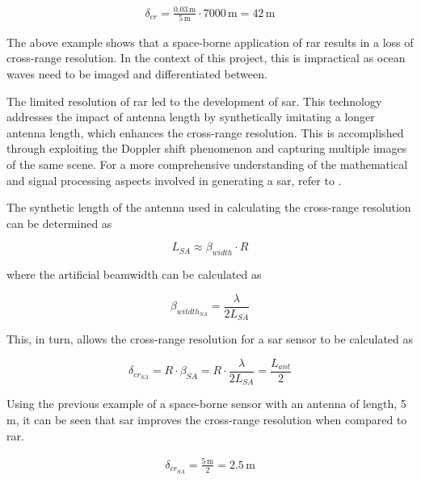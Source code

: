\begin{gather*}
    \delta_{cr} = \frac{0.03\,\text{m}}{5\,\text{m}} \cdot 7000\,\text{m} = 42\,\text{m}
\end{gather*}

The above example shows that a space-borne application of \acs{rar} results in a loss of cross-range resolution. In the context of this project, this is impractical as ocean waves need to be imaged and differentiated between.

The limited resolution of \acs{rar} led to the development of \acs{sar}. This technology addresses the impact of antenna length by synthetically imitating a longer antenna length, which enhances the cross-range resolution. This is accomplished through exploiting the Doppler shift phenomenon and capturing multiple images of the same scene. For a more comprehensive understanding of the mathematical and signal processing aspects involved in generating a \acs{sar}, refer to \cite{Cumming2005}.


The synthetic length of the antenna \cite{Meyer2019} used in calculating the cross-range resolution can be determined as

\begin{equation} \label{eq:sar.virtualAntennaL}
    L_{SA} \approx \beta_{width}\cdot R 
\end{equation}

where the artificial beamwidth can be calculated as

\begin{equation} \label{eq:sar.beamwidth}
    \beta_{witdth_{SA}} = \frac{\lambda}{2L_{SA}}
\end{equation}

This, in turn, allows the cross-range resolution \cite{Moreira2013} for a \acs{sar} sensor to be calculated as

\begin{equation} \label{eq:sar.crossRangeResolution}
    \delta_{cr_{SA}} = R\cdot \beta_{SA} = R \cdot \frac{\lambda}{2L_{SA}} = \frac{L_{ant}}{2}
\end{equation}

Using the previous example of a space-borne sensor with an antenna of length, 5\,m, it can be seen that \acs{sar} improves the cross-range resolution when compared to \acs{rar}.

\begin{gather*}
    \delta_{cr_{SA}} = \frac{5\,\text{m}}{2} = 2.5\,\text{m}
\end{gather*}

